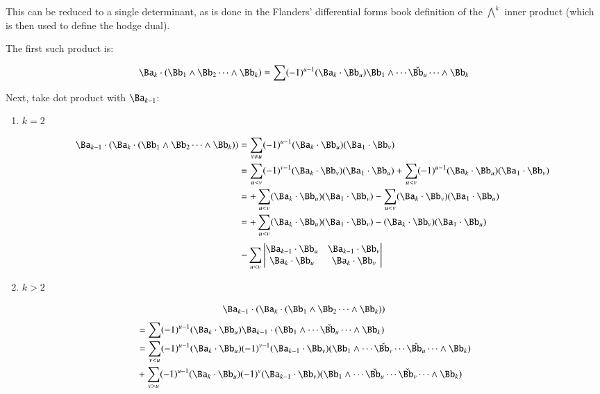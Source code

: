 This can be reduced to a single determinant, as is done in
the Flanders' differential forms book definition of the 
${\bigwedge}^k$ inner product (which is then used to define the hodge dual).

The first such product is:

\[
\Ba_k \cdot (\Bb_1 \wedge \Bb_2 \cdots \wedge \Bb_k)
= \sum (-1)^{u-1} (\Ba_k \cdot \Bb_u) \Bb_1 \wedge \cdots \check{\Bb_u} \cdots \wedge \Bb_k
\]

Next, take dot product with $\Ba_{k-1}$:

\begin{enumerate}
\item $k=2$

\begin{align*}
\Ba_{k-1} \cdot (\Ba_k \cdot (\Bb_1 \wedge \Bb_2 \cdots \wedge \Bb_k))
&= \sum_{v \ne u} (-1)^{u-1} (\Ba_k \cdot \Bb_u) (\Ba_1 \cdot \Bb_v) \\
&= 
 \sum_{u < v} (-1)^{v-1} (\Ba_k \cdot \Bb_v) (\Ba_1 \cdot \Bb_u) 
+\sum_{u < v} (-1)^{u-1} (\Ba_k \cdot \Bb_u) (\Ba_1 \cdot \Bb_v) \\
&= 
+\sum_{u < v} (\Ba_k \cdot \Bb_u) (\Ba_1 \cdot \Bb_v) 
-\sum_{u < v} (\Ba_k \cdot \Bb_v) (\Ba_1 \cdot \Bb_u) \\
&= 
+\sum_{u< v} (\Ba_k \cdot \Bb_u) (\Ba_1 \cdot \Bb_v) 
- (\Ba_k \cdot \Bb_v) (\Ba_1 \cdot \Bb_u) \\
\end{align*}
\begin{equation}\label{eqn:bladegradereduction:k2dot}
-\sum_{u< v}
\begin{vmatrix}
\Ba_{k-1} \cdot \Bb_u & \Ba_{k-1} \cdot \Bb_v \\
\Ba_k \cdot \Bb_u & \Ba_k \cdot \Bb_v \\
\end{vmatrix}
\end{equation}

\item $k>2$
\end{enumerate}

\[
\Ba_{k-1} \cdot (\Ba_k \cdot (\Bb_1 \wedge \Bb_2 \cdots \wedge \Bb_k))
\]
\begin{align*}
&= \sum (-1)^{u-1} (\Ba_k \cdot \Bb_u) \Ba_{k-1} \cdot (\Bb_1 \wedge \cdots \check{\Bb_u} \cdots \wedge \Bb_k) \\
&= \sum_{v<u} (-1)^{u-1} (\Ba_k \cdot \Bb_u) (-1)^{v-1} (\Ba_{k-1} \cdot \Bb_v) (\Bb_1 \wedge \cdots \check{\Bb_v} \cdots \check{\Bb_u} \cdots \wedge \Bb_k) \\
&+ \sum_{v>u} (-1)^{u-1} (\Ba_k \cdot \Bb_u) (-1)^{v} (\Ba_{k-1} \cdot \Bb_v) (\Bb_1 \wedge \cdots \check{\Bb_u} \cdots \check{\Bb_v} \cdots \wedge \Bb_k) \\
\end{align*}

